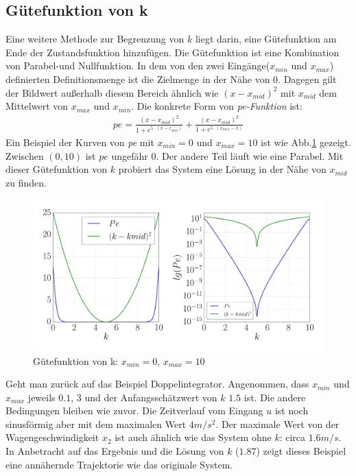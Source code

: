 \subsection{Gütefunktion von k}
\label{Gütefunktion_von_k}
Eine weitere Methode zur Begrenzung von $k$ liegt darin, eine Gütefunktion am Ende der Zustandsfunktion hinzufügen. Die Gütefunktion ist eine Kombination von Parabel-und Nullfunktion. In dem von den zwei Eingänge($x_{min}$ und $x_{max}$) definierten Definitionsmenge ist die Zielmenge in der Nähe von 0. Dagegen gilt der Bildwert außerhalb diesem Bereich ähnlich wie $(x-x_{mid})^{2}$ mit $x_{mid}$ dem Mittelwert von $x_{max}$ und $x_{min}$. Die konkrete Form von \emph{pe-Funktion} ist:
\begin{eqnarray}
pe = \frac{(x-x_{mid})^{2}}{1 + e^{5\cdot (x-x_{min})}} + \frac{(x-x_{mid})^{2}}{1 + e^{5\cdot (x_{max}-x)}}\label{eq:Gütefunktion}     
\end{eqnarray}
Ein Beispiel der Kurven von \emph{pe} mit $x_{min}=0$ und $x_{max}=10$ ist wie Abb.\ref{fig:Gütefunktion_von_k} gezeigt. Zwischen $(0,10)$ ist $pe$ ungefähr 0. Der andere Teil läuft wie eine Parabel. Mit dieser Gütefunktion von $k$ probiert das System eine Lösung in der Nähe von $x_{mid}$ zu finden.
\begin{figure}
	\centering
	\includegraphics[width=12cm]{bild/pe/pe.pdf}
	\caption{Gütefunktion von k: $x_{min}=0$, $x_{max}=10$}
	\label{fig:Gütefunktion_von_k}
\end{figure}
\begin{beispiel}
	Geht man zurück auf das Beispiel Doppelintegrator. Angenommen, dass $x_{min}$ und $x_{max}$ jeweils $0.1$, $3$ und der Anfangsschätzwert von $k$ $1.5$ ist. Die andere Bedingungen bleiben wie zuvor.
	Die Zeitverlauf vom Eingang $u$ ist noch sinusförmig aber mit dem maximalen Wert $4m/s^{2}$. Der maximale Wert von der Wagengeschwindigkeit $x_{2}$ ist auch ähnlich wie das System ohne $k$: circa $1.6m/s$. In Anbetracht auf das Ergebnis und die Lösung von $k$ ($1.87$) zeigt dieses Beispiel eine annähernde Trajektorie wie das originale System. 
\end{beispiel}


